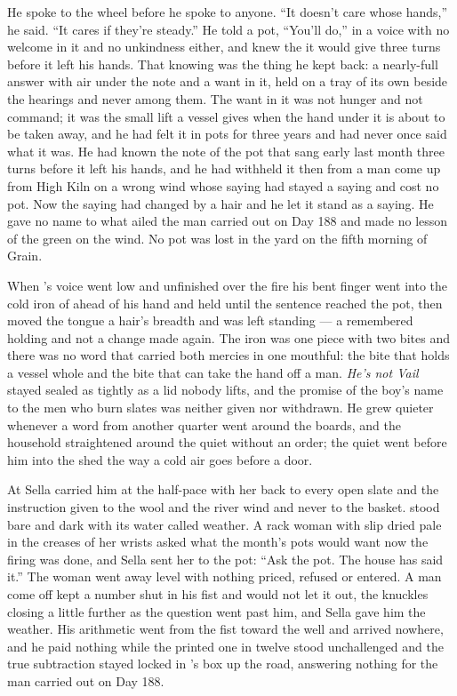 He spoke to the wheel before he spoke to anyone. “It doesn't care whose hands,” he said. “It cares if they're steady.” He told a pot, “You'll do,” in a voice with no welcome in it and no unkindness either, and knew the  it would give three turns before it left his hands. That knowing was the thing he kept back: a nearly-full answer with air under the note and a want in it, held on a tray of its own beside the hearings and never among them. The want in it was not hunger and not command; it was the small lift a vessel gives when the hand under it is about to be taken away, and he had felt it in pots for three years and had never once said what it was. He had known the note of the pot that sang early last month three turns before it left his hands, and he had withheld it then from a man come up from High Kiln on a wrong wind whose saying had stayed a saying and cost no pot. Now the saying had changed by a hair and he let it stand as a saying. He gave no name to what ailed the man carried out on Day 188 and made no lesson of the green on the wind. No pot was lost in the yard on the fifth morning of Grain.

When 's voice went low and unfinished over the fire his bent finger went into the cold iron of  ahead of his hand and held until the sentence reached the pot, then moved the tongue a hair's breadth and was left standing --- a remembered holding and not a change made again. The iron was one piece with two bites and there was no  word that carried both mercies in one mouthful: the bite that holds a vessel whole and the bite that can take the hand off a man. \emph{He's not Vail} stayed sealed as tightly as a lid nobody lifts, and the promise of the boy's name to the men who burn slates was neither given nor withdrawn. He grew quieter whenever a word from another quarter went around the boards, and the household straightened around the quiet without an order; the quiet went before him into the shed the way a cold air goes before a door.

\scenebreak

At  Sella carried him at the half-pace with her back to every open slate and the instruction given to the wool and the river wind and never to the basket.  stood bare and dark with its water called weather. A rack woman with slip dried pale in the creases of her wrists asked what the month's pots would want now the firing was done, and Sella sent her to the pot: “Ask the pot. The house has said it.” The woman went away level with nothing priced, refused or entered. A man come off  kept a number shut in his fist and would not let it out, the knuckles closing a little further as the question went past him, and Sella gave him the weather. His arithmetic went from the fist toward the well and arrived nowhere, and he paid nothing while the printed one in twelve stood unchallenged and the true subtraction stayed locked in 's box up the road, answering nothing for the man carried out on Day 188.

